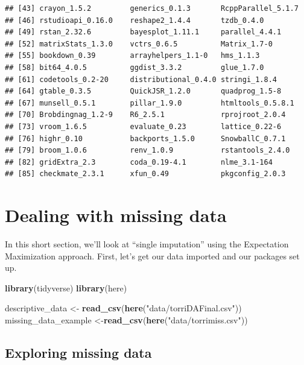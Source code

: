 \documentclass[
]{book}
\newenvironment{Shaded}{\begin{snugshade}}{\end{snugshade}}
\newcommand{\FunctionTok}[1]{\textcolor[rgb]{0.13,0.29,0.53}{\textbf{#1}}}
\newcommand{\NormalTok}[1]{#1}
\newcommand{\OtherTok}[1]{\textcolor[rgb]{0.56,0.35,0.01}{#1}}
\newcommand{\StringTok}[1]{\textcolor[rgb]{0.31,0.60,0.02}{#1}}
\begin{document}
\begin{verbatim}
## [43] crayon_1.5.2         generics_0.1.3       RcppParallel_5.1.7  
## [46] rstudioapi_0.16.0    reshape2_1.4.4       tzdb_0.4.0          
## [49] rstan_2.32.6         bayesplot_1.11.1     parallel_4.4.1      
## [52] matrixStats_1.3.0    vctrs_0.6.5          Matrix_1.7-0        
## [55] bookdown_0.39        arrayhelpers_1.1-0   hms_1.1.3           
## [58] bit64_4.0.5          ggdist_3.3.2         glue_1.7.0          
## [61] codetools_0.2-20     distributional_0.4.0 stringi_1.8.4       
## [64] gtable_0.3.5         QuickJSR_1.2.0       quadprog_1.5-8      
## [67] munsell_0.5.1        pillar_1.9.0         htmltools_0.5.8.1   
## [70] Brobdingnag_1.2-9    R6_2.5.1             rprojroot_2.0.4     
## [73] vroom_1.6.5          evaluate_0.23        lattice_0.22-6      
## [76] highr_0.10           backports_1.5.0      SnowballC_0.7.1     
## [79] broom_1.0.6          renv_1.0.9           rstantools_2.4.0    
## [82] gridExtra_2.3        coda_0.19-4.1        nlme_3.1-164        
## [85] checkmate_2.3.1      xfun_0.49            pkgconfig_2.0.3
\end{verbatim}

\chapter{Dealing with missing data}\label{dealing-with-missing-data}

In this short section, we'll look at ``single imputation'' using the Expectation Maximization approach. First, let's get our data imported and our packages set up.

\begin{Shaded}
\begin{Highlighting}[]
\FunctionTok{library}\NormalTok{(tidyverse)}
\FunctionTok{library}\NormalTok{(here)}

\NormalTok{descriptive\_data }\OtherTok{\textless{}{-}} \FunctionTok{read\_csv}\NormalTok{(}\FunctionTok{here}\NormalTok{(}\StringTok{"data/torriDAFinal.csv"}\NormalTok{))}
\NormalTok{missing\_data\_example }\OtherTok{\textless{}{-}}\FunctionTok{read\_csv}\NormalTok{(}\FunctionTok{here}\NormalTok{(}\StringTok{"data/torrimiss.csv"}\NormalTok{))}
\end{Highlighting}
\end{Shaded}

\section{Exploring missing data}\label{exploring-missing-data}
\end{document}
